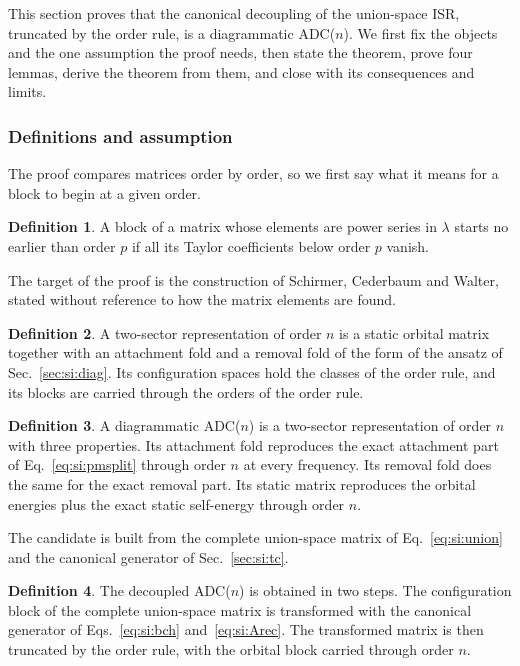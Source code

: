 \documentclass[aip,jcp,reprint,noshowkeys,superscriptaddress]{revtex4-2}
\theoremstyle{plain}
\theoremstyle{definition}
\newtheorem{definition}{Definition}
\theoremstyle{remark}
\begin{document}
This section proves that the canonical decoupling of the union-space ISR,
truncated by the order rule, is a diagrammatic ADC($n$). We first fix the
objects and the one assumption the proof needs, then state the theorem, prove
four lemmas, derive the theorem from them, and close with its consequences and
limits.

\subsubsection{Definitions and assumption}

The proof compares matrices order by order, so we first say what it means for a
block to begin at a given order.

\begin{definition}
\label{def:si:start}
A block of a matrix whose elements are power series in $\lambda$ starts no
earlier than order $p$ if all its Taylor coefficients below order $p$ vanish.
\end{definition}

The target of the proof is the construction of Schirmer, Cederbaum and
Walter,\cite{Schirmer_1983} stated without reference to how the matrix elements
are found.

\begin{definition}
\label{def:si:twosector}
A two-sector representation of order $n$ is a static orbital matrix together
with an attachment fold and a removal fold of the form of the ansatz of
Sec.~\ref{sec:si:diag}. Its configuration spaces hold the classes of the order
rule, and its blocks are carried through the orders of the order rule.
\end{definition}

\begin{definition}
\label{def:si:diagadc}
A diagrammatic ADC($n$) is a two-sector representation of order $n$ with three
properties. Its attachment fold reproduces the exact attachment part of
Eq.~\eqref{eq:si:pmsplit} through order $n$ at every frequency. Its removal
fold does the same for the exact removal part. Its static matrix reproduces the
orbital energies plus the exact static self-energy through order $n$.
\end{definition}

The candidate is built from the complete union-space matrix of
Eq.~\eqref{eq:si:union} and the canonical generator of Sec.~\ref{sec:si:tc}.

\begin{definition}
\label{def:si:decadc}
The decoupled ADC($n$) is obtained in two steps. The configuration block of the
complete union-space matrix is transformed with the canonical generator of
Eqs.~\eqref{eq:si:bch} and~\eqref{eq:si:Arec}. The transformed matrix is then
truncated by the order rule, with the orbital block carried through order $n$.
\end{definition}
\end{document}

